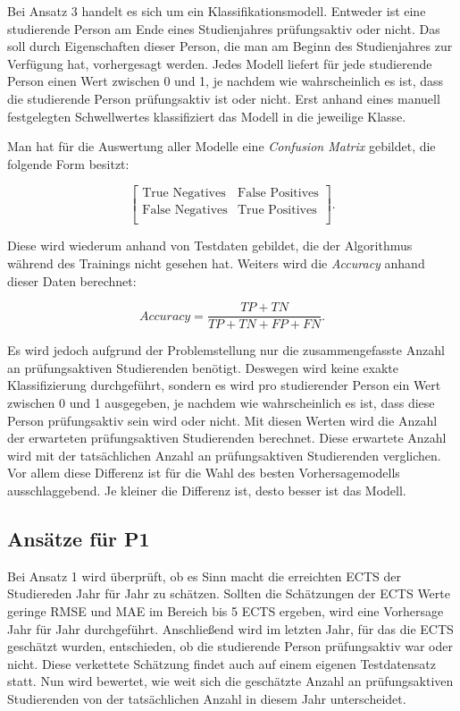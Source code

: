 Bei Ansatz 3 handelt es sich um ein Klassifikationsmodell. Entweder ist eine studierende Person am Ende eines Studienjahres pr\"ufungsaktiv oder nicht. Das soll
durch Eigenschaften dieser Person, die man am Beginn des Studienjahres zur Verf\"ugung hat, vorhergesagt werden. Jedes Modell liefert f\"ur jede studierende Person
einen Wert zwischen 0 und 1, je nachdem wie wahrscheinlich es ist, dass die studierende Person pr\"ufungsaktiv ist oder nicht. Erst anhand eines manuell festgelegten
Schwellwertes klassifiziert das Modell in die jeweilige Klasse.

Man hat f\"ur die Auswertung aller Modelle eine \textit{Confusion Matrix} gebildet, die folgende Form besitzt:

$$ \left[ \begin{array}{rr} \text{True Negatives} & \text{False Positives}  \\  \text{False Negatives} & \text{True Positives} \\  \end{array}\right] .$$

Diese wird wiederum anhand von Testdaten gebildet, die der Algorithmus w\"ahrend des Trainings nicht gesehen hat. Weiters wird die \textit{Accuracy} anhand dieser Daten berechnet:

$$ Accuracy = \frac{TP + TN}{TP + TN + FP + FN}.$$

Es wird jedoch aufgrund der Problemstellung nur die zusammengefasste Anzahl an pr\"ufungsaktiven Studierenden ben\"otigt. Deswegen wird keine exakte Klassifizierung durchgef\"uhrt,
sondern es wird pro studierender Person ein Wert zwischen 0 und 1 ausgegeben, je nachdem wie wahrscheinlich es ist, dass diese Person pr\"ufungsaktiv sein wird oder nicht.
Mit diesen Werten wird die Anzahl der erwarteten pr\"ufungsaktiven Studierenden berechnet.
Diese erwartete Anzahl wird mit der tats\"achlichen Anzahl an pr\"ufungsaktiven Studierenden verglichen.
Vor allem diese Differenz ist f\"ur die Wahl des besten Vorhersagemodells ausschlaggebend. Je kleiner die Differenz ist, desto besser ist das Modell.



\subsection{Ans\"atze f\"ur P1}
Bei Ansatz 1 wird \"uberpr\"uft, ob es Sinn macht die erreichten ECTS der Studiereden Jahr f\"ur Jahr zu sch\"atzen. Sollten die Sch\"atzungen der
ECTS Werte geringe RMSE und MAE im Bereich bis 5 ECTS ergeben, wird eine Vorhersage Jahr f\"ur Jahr durchgef\"uhrt.
Anschlie{\ss}end wird im letzten Jahr, f\"ur das die ECTS gesch\"atzt wurden, entschieden, ob die studierende Person pr\"ufungsaktiv war oder nicht.
Diese verkettete Sch\"atzung findet auch auf einem eigenen Testdatensatz statt. Nun wird bewertet, wie weit sich die gesch\"atzte Anzahl an pr\"ufungsaktiven
Studierenden von der tats\"achlichen Anzahl in diesem Jahr unterscheidet.

